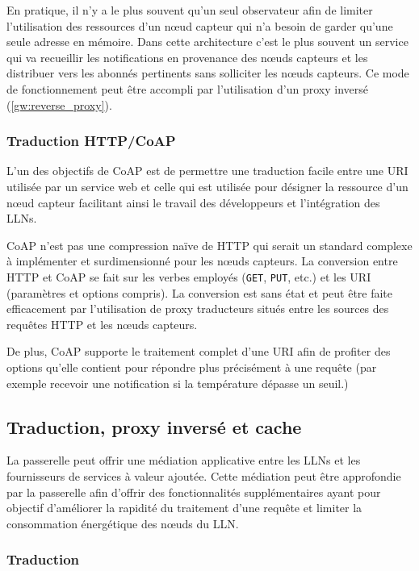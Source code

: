 En pratique, il n'y a le plus souvent qu'un seul observateur afin de limiter l'utilisation des ressources d'un nœud capteur qui n'a besoin de garder qu'une seule adresse en mémoire.
Dans cette architecture c'est le plus souvent un service qui va recueillir les notifications en provenance des nœuds capteurs et les distribuer vers les abonnés pertinents sans solliciter les nœuds capteurs.
Ce mode de fonctionnement peut être accompli par l'utilisation d'un proxy inversé (\ref{gw:reverse_proxy}).

\subsubsection{Traduction \ac{HTTP}/\ac{CoAP}}

L'un des objectifs de \ac{CoAP} est de permettre une traduction facile entre une \ac{URI} utilisée par un service web et celle qui est utilisée pour désigner la ressource d'un nœud capteur facilitant ainsi le travail des développeurs et l'intégration des \ac{LLN}s.

\ac{CoAP} n'est pas une compression naïve de \ac{HTTP} qui serait un standard complexe à implémenter et surdimensionné pour les nœuds capteurs.
La conversion entre \ac{HTTP} et \ac{CoAP} se fait sur les verbes employés (\texttt{GET}, \texttt{PUT}, etc.) et les \ac{URI} (paramètres et options compris).
La conversion est sans état et peut être faite efficacement par l'utilisation de proxy traducteurs situés entre les sources des requêtes \ac{HTTP} et les nœuds capteurs.

De plus, \ac{CoAP} supporte le traitement complet d'une \ac{URI} afin de profiter des options qu'elle contient pour répondre plus précisément à une requête (par exemple recevoir une notification si la température dépasse un seuil.)

\subsection{Traduction, proxy inversé et cache}
\label{gw:rpc}

La passerelle peut offrir une médiation applicative entre les \ac{LLN}s et les fournisseurs de services à valeur ajoutée.
Cette médiation peut être approfondie par la passerelle afin d'offrir des fonctionnalités supplémentaires ayant pour objectif d'améliorer la rapidité du traitement d'une requête et limiter la consommation énergétique des nœuds du \ac{LLN}.

\subsubsection{Traduction}
\label{gw:traduction}

